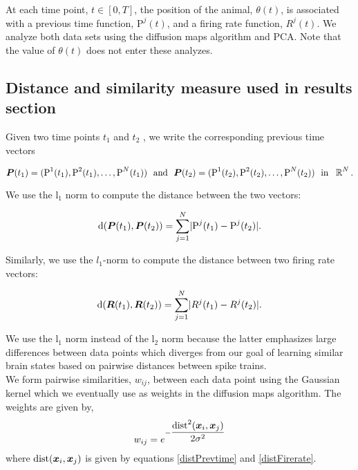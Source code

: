 At  each time point, $t  \in [0,T]$, the position of the animal, $\theta(t)$, is associated with a previous time function, $\text{P}^{j}(t)$, and a firing rate function, $R^{j}(t)$. We analyze both data sets using the diffusion maps algorithm  and  PCA. Note that the value of $\theta(t)$ does not enter these analyzes.


\subsection{Distance  and similarity measure used in results section}
Given two time points $t_{1}$ and $t_{2}$ , we write the corresponding previous time vectors 

$$ \vect{P}(t_1)= (\text{P}^{1}(t_{1}), \text{P}^{2}(t_{1}), \ldots, \text{P}^{N}(t_{1}))   \  \ \text{and} \  \ 
 \vect{P}(t_{2}) = (\text{P}^{1}(t_{2}), \text{P}^{2}(t_{2}), \ldots, \text{P}^{N}(t_{2}))  \  \ \text{in} \  \  \R^{N}.$$

We use the l$_{1}$ norm to compute the distance between the two vectors:

\begin{equation}\label{distPrevtime}
\text{d}(\boldsymbol{P}(t_{1}), \boldsymbol{P}(t_{2}) ) = 
\displaystyle \sum_{j=1}^{N} \lvert \text{P}^{j}(t_{1}) - \text{P}^{j}(t_{2})   \rvert.
\end{equation}

Similarly, we use the $l_{1}$-norm to compute the distance between two firing rate vectors:

\begin{equation}\label{distFirerate}
\text{d}(\boldsymbol{R}(t_{1}), \boldsymbol{R}(t_{2}) ) = 
\displaystyle \sum_{j=1}^{N} \lvert R^{j}(t_{1}) - R^{j}(t_{2})   \rvert.
\end{equation}

We use the  l$_1$ norm  instead of the l$_{2}$ norm because the latter emphasizes large differences between data points which diverges from our goal of learning similar brain states  based on pairwise distances between spike trains.\\


We form pairwise similarities, $w_{ij}$, between each data point using the Gaussian kernel  which we eventually use as weights in the diffusion maps algorithm. The weights are given by,
\[
w_{ij} = e^{-\dfrac{\text{dist}^{2}(\boldsymbol{x}_{i}, \boldsymbol{x}_{j})}{2\sigma^2}} 
\]   where $\text{dist}(\boldsymbol{x}_{i}, \boldsymbol{x}_{j})$ is given by equations
\eqref{distPrevtime} and \eqref{distFirerate}. 
























